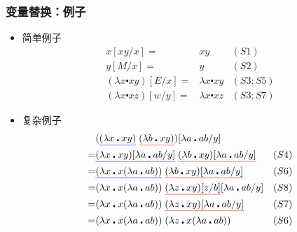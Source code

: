 \documentclass[CJK,compress,hyperref]{beamer}
\begin{document}
\begin{CJK}{UTF8}{song}
\begin{frame}
  \frametitle{变量替换：例子}  
  \begin{itemize}
  \item {简单例子}    
    \begin{eqnarray*}
      x[xy/x] = & xy  & (S1) \\ 
      y[M/x] = & y & (S2) \\ 
      (\lambda x \centerdot  xy)[E/x] = & \lambda x \centerdot xy & (S3;S5) \\  
      (\lambda x \centerdot  xz)[w/y] = & \lambda x \centerdot xz & (S3;S7) 
    \end{eqnarray*} 
  \item {复杂例子} 
    \begin{eqnarray*}
      & ({\color{blue}\underline{{\color{black}(\lambda x \centerdot xy)}}} \;  
        {\color{red}\underline{{\color{black}(\lambda b \centerdot xy)}}}) 
        [\lambda a \centerdot ab/y] & \\ 
      = & {\color{blue}\underline{{\color{black}
          (\lambda x \centerdot xy) [\lambda a \centerdot ab/y]}}} \;  
          {\color{red}\underline{{\color{black}(\lambda b \centerdot xy) 
          [\lambda a \centerdot ab/y]}}} & (S4)  \\  
      = & {\color{blue}\underline{{\color{black}
          (\lambda x \centerdot x(\lambda a \centerdot ab))}}} \;
          {\color{red}\underline{{\color{black}(\lambda b \centerdot xy) 
          [\lambda a \centerdot ab/y]}}} & (S6) \\  
      = & (\lambda x \centerdot x(\lambda a \centerdot ab)) \; 
          {\color{red}\underline{{\color{black}(\lambda z \centerdot xy) [z/b]}}}
          [\lambda a \centerdot ab/y] & (S8) \\  
      = & (\lambda x \centerdot x(\lambda a \centerdot ab)) \; 
          {\color{red}\underline{{\color{black}
          (\lambda z \centerdot xy) [\lambda a \centerdot ab/y]}}} & (S7) \\ 
      = & (\lambda x \centerdot x(\lambda a \centerdot ab)) \; 
          (\lambda z \centerdot x(\lambda a \centerdot ab)) & (S6) 
    \end{eqnarray*}
  \end{itemize}
\end{frame}


\end{CJK}
\end{document}
